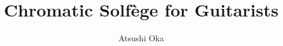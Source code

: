 \documentclass[a4paper]{article}
\title{Chromatic Solfège for Guitarists}
\author{Atsushi Oka}
\date{}
\begin{document}
\maketitle



~\newpage
\tableofcontents
~\newpage

\end{document}
